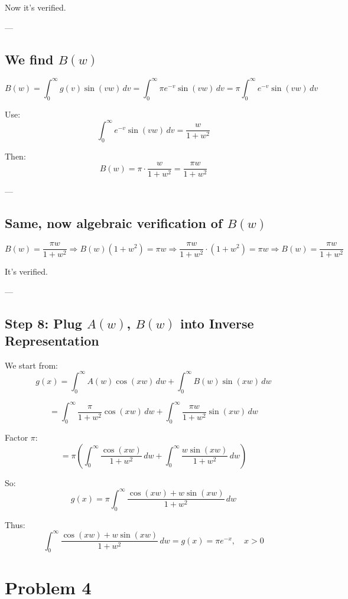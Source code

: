 \documentclass{article}
\begin{document}
Now it's verified.

---

\subsection*{We find \( B(w) \)}

\[
B(w) = \int_0^\infty g(v) \sin(vw) \, dv = \int_0^\infty \pi e^{-v} \sin(vw) \, dv = \pi \int_0^\infty e^{-v} \sin(vw) \, dv
\]

Use:
\[
\int_0^\infty e^{-v} \sin(vw) \, dv = \frac{w}{1 + w^2}
\]

Then:
\[
B(w) = \pi \cdot \frac{w}{1 + w^2}
= \frac{\pi w}{1 + w^2}
\]

---

\subsection*{Same, now algebraic verification of \( B(w) \)}

\[
B(w) = \frac{\pi w}{1 + w^2}
\Rightarrow B(w)(1 + w^2) = \pi w
\Rightarrow \frac{\pi w}{1 + w^2} \cdot (1 + w^2) = \pi w
\Rightarrow B(w) = \frac{\pi w}{1 + w^2}
\]

It's verified.

---

\subsection*{Step 8: Plug \( A(w) \), \( B(w) \) into Inverse Representation}

We start from:
\[
g(x) = \int_0^\infty A(w) \cos(xw) \, dw + \int_0^\infty B(w) \sin(xw) \, dw
\]

\[
= \int_0^\infty \frac{\pi}{1 + w^2} \cos(xw) \, dw + \int_0^\infty \frac{\pi w}{1 + w^2} \sin(xw) \, dw
\]

Factor \( \pi \):
\[
= \pi \left( \int_0^\infty \frac{\cos(xw)}{1 + w^2} \, dw + \int_0^\infty \frac{w \sin(xw)}{1 + w^2} \, dw \right)
\]

So:
\[
g(x) = \pi \int_0^\infty \frac{\cos(xw) + w \sin(xw)}{1 + w^2} \, dw
\]

Thus:
\[
\boxed{
\int_0^\infty \frac{\cos(xw) + w \sin(xw)}{1 + w^2} \, dw = g(x) = \pi e^{-x}, \quad x > 0
}
\]


\newpage
\section*{Problem 4}
\end{document}
